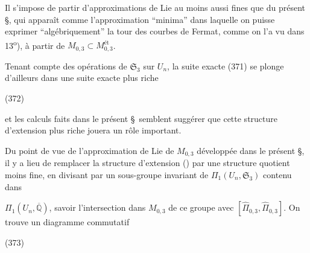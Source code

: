 
Il s'impose de partir d'approximations de Lie au moins aussi fines que  du présent \S, qui apparaît comme l'approximation ``minima'' dans laquelle on puisse exprimer ``algébriquement'' la tour des courbes de Fermat,  comme on l'a vu dans 13\textsuperscript{o}), à partir de $M_{0,3}\subset M_{0,3}^{\text{ét}}$.

Tenant compte des opérations de $\mathfrak S_3$ sur $U_n$, la suite exacte (371) se plonge d'ailleurs dans une suite exacte plus riche

\noindent (372)

et les calculs faits dans le présent \S\ semblent suggérer que cette structure d'extension plus riche jouera un rôle important.

Du point de vue de l'approximation de Lie de $M_{0,3}$ développée dans le présent \S, il y a lieu de remplacer la structure d'extension () par une structure quotient moins fine, en divisant par un sous-groupe invariant de $\Pi_1(U_n,\mathfrak S_3)$ contenu dans


$\Pi_1(U_n,\overline{\mathbb Q})$, savoir l'intersection dans $M_{0,3}$ de ce groupe avec $[\widehat\Pi_{0,3},\widehat\Pi_{0,3}]$. On trouve un diagramme commutatif

\noindent (373)

